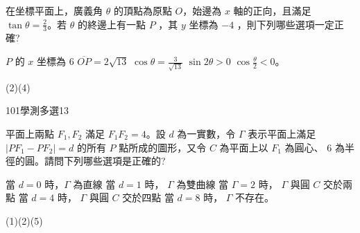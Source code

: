 \begin{QUESTIONS}
\begin{QUESTION}
\begin{ExamAnsRateInfo}{42}{64}{40}{22}
        \end{ExamAnsRateInfo}
        \begin{QBODY}
            在坐標平面上，廣義角 $\theta$ 的頂點為原點 $O$，始邊為 $x$ 軸的正向，且滿足 $\tan \theta =\frac{2}{3}$。若 $\theta$ 的終邊上有一點 $P$ ，其 $y$ 坐標為 $-4$ ，則下列哪些選項一定正確? 
			\begin{QOPS} 
				\QOP $P$ 的 $x$ 坐標為 6 
				\QOP $\overline{OP} = 2\sqrt{13}$ 
				\QOP $\cos\theta = \frac{3}{\sqrt{13}}$ 
				\QOP $\sin 2\theta >0$ 
				\QOP $\cos \frac{\theta}{2} <0$。
			\end{QOPS}
        \end{QBODY}
        \begin{QFROMS}
        \end{QFROMS}
        \begin{QTAGS}\end{QTAGS}
        \begin{QANS}
            (2)(4)
        \end{QANS}
        \begin{QSOLLIST}
        \end{QSOLLIST}
        \begin{QEMPTYSPACE}
        \end{QEMPTYSPACE}
    \end{QUESTION}
    \begin{QUESTION}
        \begin{ExamInfo}{101}{學測}{多選}{13}
        \end{ExamInfo}
        \begin{ExamAnsRateInfo}{45}{79}{40}{16}
        \end{ExamAnsRateInfo}
        \begin{QBODY}
            平面上兩點 $F_1,F_2$ 滿足 $F_1F_2 =4$。設 $d$ 為一實數，令 $\Gamma$ 表示平面上滿足 $|PF_1 -PF_2|=d$ 的所有 $P$ 點所成的圖形，又令 $C$ 為平面上以 $F_1$ 為圓心、 6 為半徑的圓。請問下列哪些選項是正確的?
			\begin{QOPS}
				\QOP 當 $d = 0$ 時，$\Gamma$ 為直線 
				\QOP 當 $d =1$ 時， $\Gamma$ 為雙曲線 
				\QOP 當 $\Gamma = 2$ 時， $\Gamma$ 與圓 $C$ 交於兩點 
				\QOP 當 $d = 4$ 時， $\Gamma$ 與圓 $C$ 交於四點 
				\QOP 當 $d = 8$ 時， $\Gamma$ 不存在。
			\end{QOPS}
        \end{QBODY}
        \begin{QFROMS}
        \end{QFROMS}
        \begin{QTAGS}\end{QTAGS}
        \begin{QANS}
            (1)(2)(5)
        \end{QANS}
        \begin{QSOLLIST}
        \end{QSOLLIST}
        \begin{QEMPTYSPACE}
        \end{QEMPTYSPACE}
    \end{QUESTION}
\end{QUESTIONS}
